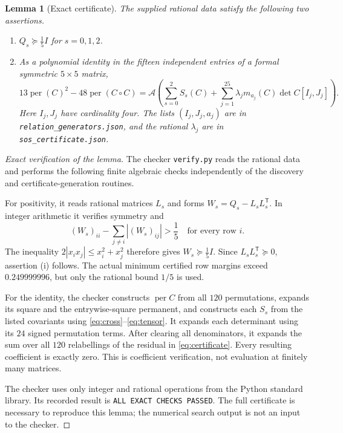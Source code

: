 \documentclass[11pt,a4paper]{article}
\newcommand{\per}{\operatorname{per}}
\newcommand{\calA}{\mathcal A}
\newtheorem{lemma}[theorem]{Lemma}
\theoremstyle{remark}\newtheorem{remark}[theorem]{Remark}
\begin{document}
\begin{lemma}[Exact certificate]\label{lem:certificate}
The supplied rational data satisfy the following two assertions.
\begin{enumerate}[label=(\roman*),nosep]
\item $Q_s\succeq\tfrac15 I$ for $s=0,1,2$.
\item As a polynomial identity in the fifteen independent entries of a formal symmetric $5\times5$ matrix,
\begin{equation}\label{eq:certificate}
 13\per(C)^2-48\per(C\circ C)
 =\calA\left(\sum_{s=0}^2 S_s(C)
   +\sum_{j=1}^{25}\lambda_j m_{a_j}(C)\det C[I_j,J_j]\right).
\end{equation}
Here $I_j,J_j$ have cardinality four. The lists $(I_j,J_j,a_j)$ are in \nolinkurl{relation_generators.json}, and the rational $\lambda_j$ are in \nolinkurl{sos_certificate.json}.
\end{enumerate}
\end{lemma}
\begin{proof}[Exact verification of the lemma]
The checker \nolinkurl{verify.py} reads the rational data and performs the following finite algebraic checks independently of the discovery and certificate-generation routines.

For positivity, it reads rational matrices $L_s$ and forms $W_s=Q_s-L_sL_s^{\mathsf T}$. In integer arithmetic it verifies symmetry and
\begin{equation}\label{eq:dd}
 (W_s)_{ii}-\sum_{j\ne i}|(W_s)_{ij}|>\frac15
 \quad\text{for every row }i.
\end{equation}
The inequality $2|x_ix_j|\leq x_i^2+x_j^2$ therefore gives $W_s\succeq\tfrac15I$. Since $L_sL_s^{\mathsf T}\succeq0$, assertion (i) follows. The actual minimum certified row margins exceed $0.249999996$, but only the rational bound $1/5$ is used.

For the identity, the checker constructs $\per C$ from all $120$ permutations, expands its square and the entrywise-square permanent, and constructs each $S_s$ from the listed covariants using \eqref{eq:cross}--\eqref{eq:tensor}. It expands each determinant using its $24$ signed permutation terms. After clearing all denominators, it expands the sum over all $120$ relabellings of the residual in \eqref{eq:certificate}. Every resulting coefficient is exactly zero. This is coefficient verification, not evaluation at finitely many matrices.

The checker uses only integer and rational operations from the Python standard library. Its recorded result is \texttt{ALL EXACT CHECKS PASSED}. The full certificate is necessary to reproduce this lemma; the numerical search output is not an input to the checker.
\end{proof}
\end{document}
